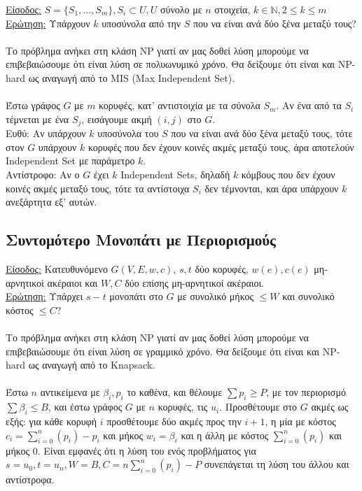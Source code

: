 \documentclass[12pt,a4paper]{article}
\begin{document}
    \underline{Είσοδος:} \(S=\{S_1, ..., S_m\}, S_i \subset U, U\) σύνολο με 
    \(n\) στοιχεία, \(k \in \mathbb{N}, 2 \le k \le m\)
    \\
    \underline{Ερώτηση:} Υπάρχουν \(k\) υποσύνολα από την \(S\) που να είναι ανά
    δύο ξένα μεταξύ τους?
    \\
    \\
    Το πρόβλημα ανήκει στη κλάση {\latintext NP} γιατί αν μας δοθεί λύση
    μπορούμε να
    επιβεβαιώσουμε ότι είναι λύση σε πολυωνυμικό χρόνο. Θα δείξουμε ότι είναι
    και {\latintext NP-hard} ως αναγωγή από το {\latintext MIS (Max
    Independent Set)}.
    \\
    \\
    Έστω γράφος \(G\) με \(m\) κορυφές, κατ' αντιστοιχία με τα σύνολα \(S_m\).
    Αν ένα από τα \(S_i\) τέμνεται με ένα \(S_j\), εισάγουμε ακμή \((i, j)\)
    στο \(G\).
    \\
    Ευθύ: Αν υπάρχουν \(k\) υποσύνολα του \(S\) που να είναι ανά
    δύο ξένα μεταξύ τους, τότε στον \(G\) υπάρχουν \(k\) κορυφές που δεν έχουν
    κοινές ακμές μεταξύ τους, άρα αποτελούν {\latintext Independent Set} με
    παράμετρο \(k\).
    \\
    Αντίστροφο: Αν ο \(G\) έχει \(k\) {\latintext Independent Sets}, δηλαδή
    \(k\) κόμβους που δεν έχουν κοινές ακμές μεταξύ τους, τότε τα
    αντίστοιχα \(S_i\) δεν τέμνονται, και άρα υπάρχουν \(k\) ανεξάρτητα εξ'
    αυτών.

  \subsection{Συντομότερο Μονοπάτι με Περιορισμούς}%

    \underline{Είσοδος:} Κατευθυνόμενο \(G(V, E, w, c)\), \(s, t\) δύο κορυφές,
    \( w(e), c(e)\) μη-αρνητικοί ακέραιοι και \(W, C\) δύο επίσης μη-αρνητικοί
    ακέραιοι.
    \\
    \underline{Ερώτηση:} Υπάρχει \(s-t\) μονοπάτι στο \(G\) με συνολικό μήκος 
    \(\le W\) και συνολικό κόστος \(\le C\)?
    \\
    \\
    Το πρόβλημα ανήκει στη κλάση {\latintext NP} γιατί αν μας δοθεί λύση
    μπορούμε να
    επιβεβαιώσουμε ότι είναι λύση σε γραμμικό χρόνο. Θα δείξουμε ότι είναι
    και {\latintext NP-hard} ως αναγωγή από το {\latintext Knapsack}.
    \\
    \\
    Έστω \(n\) αντικείμενα με \(\beta_i, p_i\) το καθένα, και θέλουμε \(
    \sum{p_i} \ge P\), με τον περιορισμό \(\sum{\beta_i} \le B\), και έστω
    γράφος \(G\) με \(n\) κορυφές, τις \(u_i\).
    Προσθέτουμε στο \(G\) ακμές ως εξής:
    για κάθε κορυφή \(i\) προσθέτουμε δύο ακμές προς την \(i + 1\), η μία με 
    κόστος \(c_i=\sum_{i=0}^{n}{(p_i)} - p_i\) και μήκος \(w_i=\beta_i\) και η
    άλλη με κόστος \(\sum_{i=0}^{n}{(p_i)}\) και μήκος 0.
    Είναι εμφανές ότι η λύση του ενός προβλήματος για \(s=u_0, 
    t=u_n, W=B, C=n\sum_{i=0}^{n}{(p_i)} - P\)
    συνεπάγεται τη λύση του άλλου και αντίστροφα.
\end{document}
